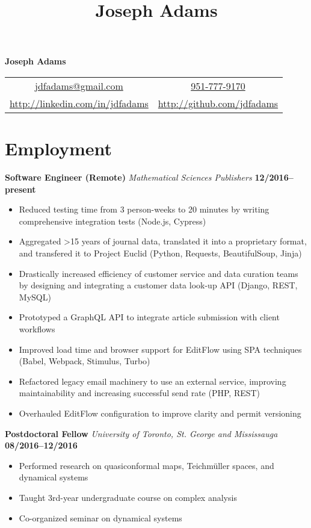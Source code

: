 \documentclass[11pt]{article}
\title{Joseph Adams}
\makeatletter
\newcommand\email{jdfadams@gmail.com}
\newcommand\phone{951-777-9170}
\makeatother
\begin{document}

\begin{center}
  \textbf{\Large Joseph Adams} \\[1.5\baselineskip]
  \begin{tabular}{c c}
    \href{mailto:\email}{\email} & \href{tel:1-\phone}{\phone} \\
    \url{http://linkedin.com/in/jdfadams} & \url{http://github.com/jdfadams}
  \end{tabular}
\end{center}

\section*{Employment}
\noindent\textbf{Software Engineer (Remote)} \emph{Mathematical Sciences Publishers} \hfill \textbf{12/2016--present}
\begin{itemize}
  \item Reduced testing time from 3 person-weeks to 20 minutes by writing comprehensive integration tests (Node.js, Cypress)
  \item Aggregated >15 years of journal data, translated it into a proprietary format, and transfered it to Project Euclid (Python, Requests, BeautifulSoup, Jinja)
  \item Drastically increased efficiency of customer service and data curation teams by designing and integrating a customer data look-up API (Django, REST, MySQL) 
  \item Prototyped a GraphQL API to integrate article submission with client workflows
  \item Improved load time and browser support for EditFlow using SPA techniques (Babel, Webpack, Stimulus, Turbo)
  \item Refactored legacy email machinery to use an external service, improving maintainability and increasing successful send rate (PHP, REST)
  \item Overhauled EditFlow configuration to improve clarity and permit versioning
\end{itemize}
\vspace{0.5cm}
\noindent\textbf{Postdoctoral Fellow} \emph{University of Toronto, St. George and Mississauga} \hfill \textbf{08/2016--12/2016}
\begin{itemize}
  \itemsep 0em
  \item Performed research on quasiconformal maps, Teichm\"{u}ller spaces, and dynamical systems
  \item Taught 3rd-year undergraduate course on complex analysis
  \item Co-organized seminar on dynamical systems
\end{itemize}
\end{document}
